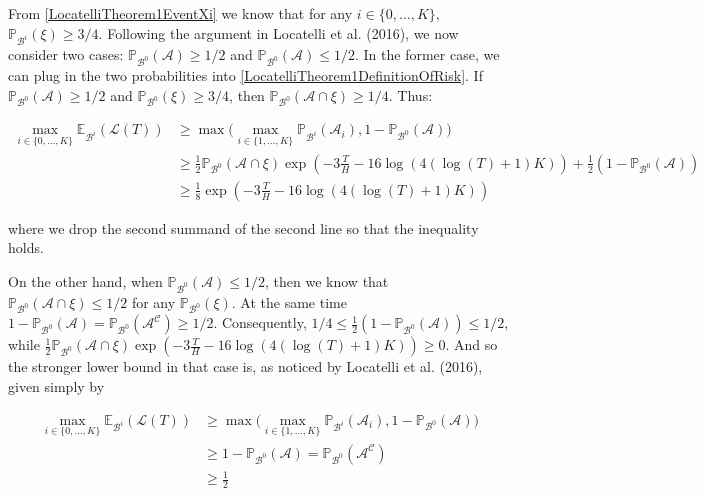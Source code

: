 \documentclass[11pt,]{article}
\begin{document}
From \eqref{LocatelliTheorem1EventXi} we know that for any
\(i \in \{0, \dots, K\}\), \(\mathbb{P}_{\mathcal{B}^i}(\xi) \geq 3/4\).
Following the argument in Locatelli et al. (2016), we now consider two
cases: \(\mathbb{P}_{\mathcal{B}^0}(\mathcal{A}) \geq 1/2\) and
\(\mathbb{P}_{\mathcal{B}^0}(\mathcal{A}) \leq 1/2\). In the former
case, we can plug in the two probabilities into
\eqref{LocatelliTheorem1DefinitionOfRisk}. If
\(\mathbb{P}_{\mathcal{B}^0}(\mathcal{A}) \geq 1/2\) and
\(\mathbb{P}_{\mathcal{B}^0}(\xi) \geq 3/4\), then
\(\mathbb{P}_{\mathcal{B}^0}(\mathcal{A} \cap \xi) \geq 1/4\). Thus:

\begin{align*}
\max_{i \in \{0, \dots, K\}} \mathbb{E}_{\mathcal{B}^i} (\mathcal{L}(T)) & \geq \max \big( \max_{i \in \{1, \dots, K\}} \mathbb{P}_{\mathcal{B}^i}(\mathcal{A}_i), 1 - \mathbb{P}_{\mathcal{B}^0}(\mathcal{A}) \big) \\
& \geq \frac{1}{2}\mathbb{P}_{\mathcal{B}^0} (\mathcal{A} \cap \xi) \exp (- 3 \frac{T}{H} -16 \log(4(\log(T)+1)K)) + \frac{1}{2}(1 - \mathbb{P}_{\mathcal{B}^0}(\mathcal{A})) \\
& \geq \frac{1}{8} \exp (- 3 \frac{T}{H} -16 \log(4(\log(T)+1)K))
\end{align*}

where we drop the second summand of the second line so that the
inequality holds.

On the other hand, when
\(\mathbb{P}_{\mathcal{B}^0}(\mathcal{A}) \leq 1/2\), then we know that
\(\mathbb{P}_{\mathcal{B}^0}(\mathcal{A} \cap \xi) \leq 1/2\) for any
\(\mathbb{P}_{\mathcal{B}^0}(\xi)\). At the same time
\(1-\mathbb{P}_{\mathcal{B}^0}(\mathcal{A}) = \mathbb{P}_{\mathcal{B}^0}(\mathcal{A^C}) \geq 1/2\).
Consequently,
\(1/4 \leq \frac{1}{2}(1 - \mathbb{P}_{\mathcal{B}^0}(\mathcal{A})) \leq 1/2\),
while
\(\frac{1}{2}\mathbb{P}_{\mathcal{B}^0} (\mathcal{A} \cap \xi) \exp (- 3 \frac{T}{H} -16 \log(4(\log(T)+1)K)) \geq 0\).
And so the stronger lower bound in that case is, as noticed by Locatelli
et al. (2016), given simply by

\begin{align*}
\max_{i \in \{0, \dots, K\}} \mathbb{E}_{\mathcal{B}^i} (\mathcal{L}(T)) & \geq \max \big( \max_{i \in \{1, \dots, K\}} \mathbb{P}_{\mathcal{B}^i}(\mathcal{A}_i), 1 - \mathbb{P}_{\mathcal{B}^0}(\mathcal{A}) \big) \\
& \geq 1 - \mathbb{P}_{\mathcal{B}^0}(\mathcal{A}) = \mathbb{P}_{\mathcal{B}^0}(\mathcal{A^C}) \\
& \geq \frac{1}{2}
\end{align*}
\end{document}
